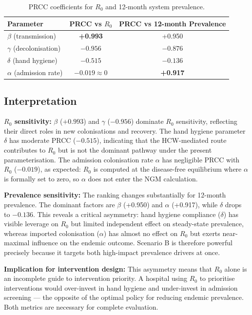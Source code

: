 \documentclass[12pt,a4paper]{article}
\begin{document}
\begin{table}[H]
  \centering
  \caption{PRCC coefficients for $R_0$ and 12-month system prevalence.}
  \label{tab:prcc-results}
  \begin{tabular}{>{\raggedright\arraybackslash}p{4.1cm}cc}
    \toprule
    Parameter & PRCC vs $R_0$ & PRCC vs 12-month Prevalence \\
    \midrule
    $\beta$ (transmission) & \textbf{+0.993} & +0.950 \\
    $\gamma$ (decolonisation) & \textbf{$-0.956$} & $-0.876$ \\
    $\delta$ (hand hygiene) & $-0.515$ & $-0.136$ \\
    $\alpha$ (admission rate) & $-0.019 \approx 0$ & \textbf{+0.917} \\
    \bottomrule
  \end{tabular}
\end{table}

\subsection{Interpretation}

\textbf{$R_0$ sensitivity:} $\beta$ ($+0.993$) and $\gamma$ ($-0.956$) dominate $R_0$ sensitivity, reflecting their direct roles in new colonisations and recovery. The hand hygiene parameter $\delta$ has moderate PRCC ($-0.515$), indicating that the HCW-mediated route contributes to $R_0$ but is not the dominant pathway under the present parameterisation. The admission colonisation rate $\alpha$ has negligible PRCC with $R_0$ ($-0.019$), as expected: $R_0$ is computed at the disease-free equilibrium where $\alpha$ is formally set to zero, so $\alpha$ does not enter the NGM calculation.

\textbf{Prevalence sensitivity:} The ranking changes substantially for 12-month prevalence. The dominant factors are $\beta$ (+0.950) and $\alpha$ (+0.917), while $\delta$ drops to $-0.136$. This reveals a critical asymmetry: hand hygiene compliance ($\delta$) has visible leverage on $R_0$ but limited independent effect on steady-state prevalence, whereas imported colonisation ($\alpha$) has almost no effect on $R_0$ but exerts near-maximal influence on the endemic outcome. Scenario B is therefore powerful precisely because it targets both high-impact prevalence drivers at once.

\textbf{Implication for intervention design:} This asymmetry means that $R_0$ alone is an incomplete guide to intervention priority. A hospital using $R_0$ to prioritise interventions would over-invest in hand hygiene and under-invest in admission screening --- the opposite of the optimal policy for reducing endemic prevalence. Both metrics are necessary for complete evaluation.
\end{document}
